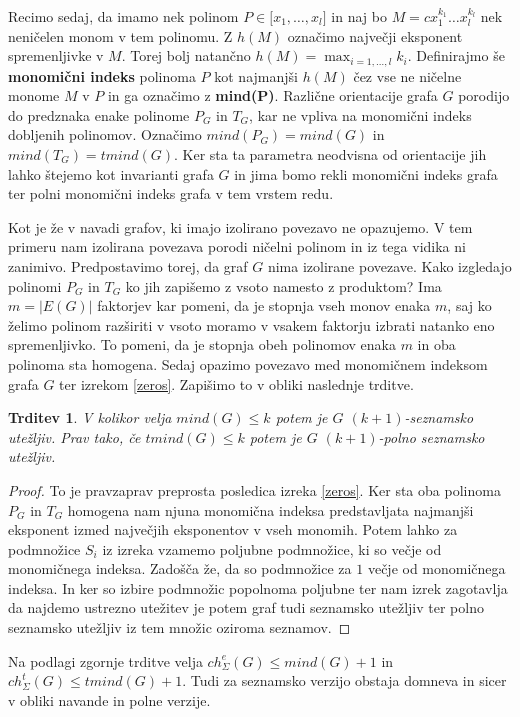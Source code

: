 \documentclass[12pt,a4paper,twoside]{article}
\theoremstyle{definition} %
\theoremstyle{plain} %
\newtheorem{trditev}[definicija]{Trditev}
\newcommand{\ecl}{ch_{\Sigma}^e}
\newcommand{\eclt}{ch_{\Sigma}^t}
\numberwithin{equation}{section}  %
\begin{document}
Recimo sedaj, da imamo nek polinom $ P \in \mathbb[x_1, \ldots, x_l]$ in naj bo $M = cx_1^{k_1} \ldots x_l^{k_l}$ nek neničelen monom v tem polinomu. Z $h(M)$ označimo največji eksponent spremenljivke v $M$. Torej bolj natančno $h(M) = \max_{i = 1, \ldots, l} k_i$. Definirajmo še \textbf{monomični indeks} polinoma $P$ kot najmanjši $h(M)$ čez vse ne ničelne monome $M$ v $P$ in ga označimo z \textbf{mind(P)}. Različne orientacije grafa $G$ porodijo do predznaka enake polinome $P_G$ in $T_G$, kar ne vpliva na monomični indeks dobljenih polinomov. Označimo $mind(P_G) = mind(G)$ in $mind(T_G) = tmind(G)$. Ker sta ta parametra neodvisna od orientacije jih lahko štejemo kot invarianti grafa $G$ in jima bomo rekli monomični indeks grafa ter polni monomični indeks grafa v tem vrstem redu. 

Kot je že v navadi grafov, ki imajo izolirano povezavo ne opazujemo. V tem primeru nam izolirana povezava porodi ničelni polinom in iz tega vidika ni zanimivo. Predpostavimo torej, da graf $G$ nima izolirane povezave. Kako izgledajo polinomi $P_G$ in $T_G$ ko jih zapišemo z vsoto namesto z produktom? Ima $m = |E(G)|$ faktorjev kar pomeni, da je stopnja vseh monov enaka $m$, saj ko želimo polinom razširiti v vsoto moramo v vsakem faktorju izbrati natanko eno spremenljivko. To pomeni, da je stopnja obeh polinomov enaka $m$ in oba polinoma sta homogena. Sedaj opazimo povezavo med monomičnem indeksom grafa $G$ ter izrekom \ref{zeros}. Zapišimo to v obliki naslednje trditve.
\begin{trditev}
V kolikor velja $mind(G) \le k$ potem je $G$ $(k+1)$-seznamsko utežljiv. Prav tako, če $tmind(G) \le k$ potem je $G$ $(k+1)$-polno seznamsko utežljiv.
\end{trditev}

\begin{proof}
To je pravzaprav preprosta posledica izreka \ref{zeros}. Ker sta oba polinoma $P_G$ in $T_G$ homogena nam njuna monomična indeksa predstavljata najmanjši eksponent izmed največjih eksponentov v vseh monomih. Potem lahko za podmnožice $S_i$ iz izreka vzamemo poljubne podmnožice, ki so večje od monomičnega indeksa. Zadošča že, da so podmnožice za $1$ večje od monomičnega indeksa. In ker so izbire podmnožic popolnoma poljubne ter nam izrek zagotavlja da najdemo ustrezno utežitev je potem graf tudi seznamsko utežljiv ter polno seznamsko utežljiv iz tem množic oziroma seznamov.
\end{proof}

Na podlagi zgornje trditve velja $\ecl(G) \le mind(G) + 1$ in $\eclt(G) \le tmind(G) + 1$. Tudi za seznamsko verzijo obstaja domneva in sicer v obliki navande in polne verzije.
\end{document}
